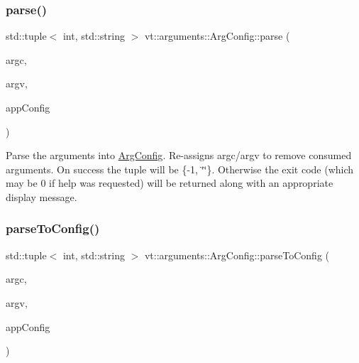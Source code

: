 \mbox{\label{structvt_1_1arguments_1_1_arg_config_a56183006ac2bce88c5cda3d2716a1e2d}} 
\subsubsection{\texorpdfstring{parse()}{parse()}}
{\footnotesize\ttfamily std\+::tuple$<$ int, std\+::string $>$ vt\+::arguments\+::\+Arg\+Config\+::parse (\begin{DoxyParamCaption}\item[{int \&}]{argc,  }\item[{char $\ast$$\ast$\&}]{argv,  }\item[{\hyperlink{structvt_1_1arguments_1_1_app_config}{App\+Config} const $\ast$}]{app\+Config }\end{DoxyParamCaption})}

Parse the arguments into \hyperlink{structvt_1_1arguments_1_1_arg_config}{Arg\+Config}. Re-\/assigns argc/argv to remove consumed arguments. On success the tuple will be \{-\/1, \char`\"{}\char`\"{}\}. Otherwise the exit code (which may be 0 if help was requested) will be returned along with an appropriate display message. \mbox{\label{structvt_1_1arguments_1_1_arg_config_a559994991752599b39a6593da9605599}} 
\subsubsection{\texorpdfstring{parse\+To\+Config()}{parseToConfig()}}
{\footnotesize\ttfamily std\+::tuple$<$ int, std\+::string $>$ vt\+::arguments\+::\+Arg\+Config\+::parse\+To\+Config (\begin{DoxyParamCaption}\item[{int \&}]{argc,  }\item[{char $\ast$$\ast$\&}]{argv,  }\item[{\hyperlink{structvt_1_1arguments_1_1_app_config}{App\+Config} \&}]{app\+Config }\end{DoxyParamCaption})\hspace{0.3cm}{\ttfamily [private]}}


